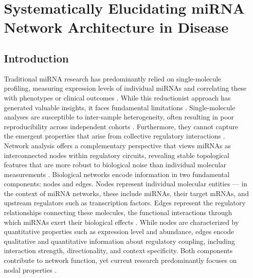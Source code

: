 \chapter{Systematically Elucidating miRNA Network Architecture in Disease}
\label{chp:systematically-elucidating-mirna-network}

\section{Introduction}

Traditional miRNA research has predominantly relied on single-molecule profiling, measuring expression levels of individual miRNAs and correlating these with phenotypes or clinical outcomes \cite{hammond2010american}. While this reductionist approach has generated valuable insights, it faces fundamental limitations \cite{penaultl2012patholog}. Single-molecule analyses are susceptible to inter-sample heterogeneity, often resulting in poor reproducibility across independent cohorts \cite{kumar2023impact,yang2024role}. Furthermore, they cannot capture the emergent properties that arise from collective regulatory interactions \cite{loh2019regulato}. Network analysis offers a complementary perspective that views miRNAs as interconnected nodes within regulatory circuits, revealing stable topological features that are more robust to biological noise than individual molecular measurements \cite{fuchswig2018target}. Biological networks encode information in two fundamental components: nodes and edges. Nodes represent individual molecular entities --- in the context of miRNA networks, these include miRNAs, their target mRNAs, and upstream regulators such as transcription factors. Edges represent the regulatory relationships connecting these molecules, the functional interactions through which miRNAs exert their biological effects \cite{tian2022comparat}. While nodes are characterized by quantitative properties such as expression level and abundance, edges encode qualitative and quantitative information about regulatory coupling, including interaction strength, directionality, and context specificity. Both components contribute to network function, yet current research predominantly focuses on nodal properties \cite{lai2016understa}.

